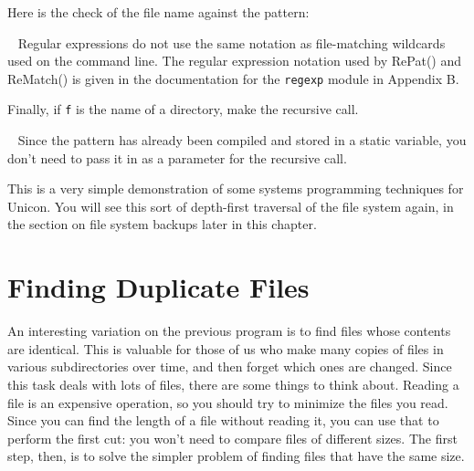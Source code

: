 
Here is the check of the file name against the pattern:


\medskip{}\ {\sffamily
Regular expressions do not use the same notation as file-matching
wildcards used on the command line. The regular expression notation
used by RePat() and ReMatch() is given in the documentation for the
\texttt{regexp} module in Appendix B.}\medskip

Finally, if \texttt{f} is the name of a directory, make the recursive
call.

\medskip{}\ {\sffamily
Since the pattern has already been compiled and stored
in a static variable, you don't need to pass it in as
a parameter for the recursive call.}\medskip


This is a very simple demonstration of some systems programming
techniques for Unicon. You will see this sort of depth-first traversal
of the file system again, in the section on file system backups later
in this chapter.

\section{Finding Duplicate Files}

An interesting variation on the previous program is to find files whose
contents are identical. This is valuable for those of us who make many
copies of files in various subdirectories over time, and then forget
which ones are changed. Since this task deals with lots of files, there
are some things to think about. Reading a file is an expensive
operation, so you should try to minimize the files you read. Since you
can find the length of a file without reading it, you can use that to
perform the first cut: you won't need to compare files
of different sizes. The first step, then, is to solve the simpler
problem of finding files that have the same size.

